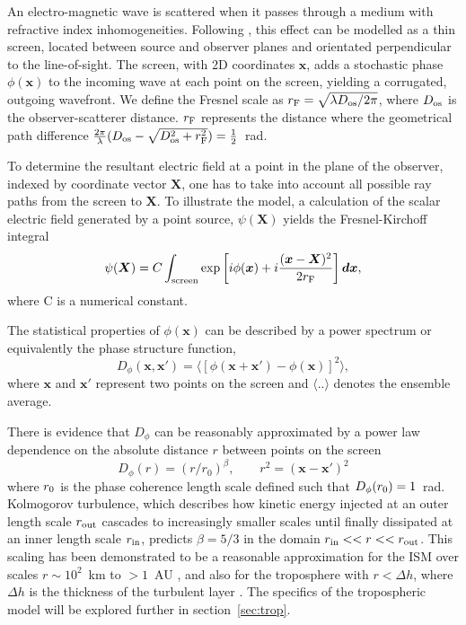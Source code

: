 An electro-magnetic wave is scattered when it passes through a medium with refractive index inhomogeneities. Following \citet{Narayan_1992}, this effect can be modelled as a thin screen, located between source and observer planes and orientated perpendicular to the line-of-sight. The screen, with 2D coordinates $\mathbf{x}$, adds a stochastic phase $\phi(\mathbf{x})$ to the incoming wave at each point on the screen, yielding a corrugated, outgoing wavefront. We define the Fresnel scale as  $r_{\rm F} = \sqrt{\lambda D_{\rm os}/2\pi}$, where $D_{\rm os}$ is the observer-scatterer distance.  $r_{\rm F}$ represents the distance where the geometrical path difference $\frac{2\pi}{\lambda} (D_{\rm os} - \sqrt{D_{\rm os}^2 + r_{\rm F}^2}) =\frac{1}{2}$~rad.

To determine the resultant electric field at a point in the plane of the observer, indexed by coordinate vector $\bm{X}$, one has to take into account all possible ray paths from the screen to $\bm{X}$. To illustrate the model, a calculation of the scalar electric field generated by a point source, $\psi(\bm{X})$ yields the Fresnel-Kirchoff integral \citep*{BORN_1980}
\begin{equation}\label{Fresnel- Kirchoff}
\psi(\boldsymbol{X}) = C \int_{\rm screen} \exp\left[i\phi(\boldsymbol{x}) + i \frac{(\boldsymbol{x}-\boldsymbol{X})^2}{2 r_{\rm F}}\right]\boldsymbol{dx},
\end{equation}
where C is a numerical constant.

The statistical properties of $\phi(\mathbf{x})$ can be described by a power spectrum or equivalently the phase structure function,
\begin{equation}\label{eq:D_phi}
D_\phi (\mathbf{x},\mathbf{x'}) = \langle \left[ \phi(\mathbf{x} +\mathbf{x'}) - \phi(\mathbf{x})\right]^2 \rangle,
\end{equation}
where $\mathbf{x}$ and $\mathbf{x'} $ represent two points on the screen and $\langle .. \rangle$ denotes the ensemble average. 

There is evidence that $D_\phi$ can be reasonably approximated by a power law dependence on the absolute distance $r$ between points on the screen  \citep{Armstrong_1995,carilli_1997}
\begin{equation}
D_\phi (r) =  (r/r_0)^\beta,\qquad r^2 = (\mathbf{x} - \mathbf{x'})^2
\label{kolmogorov}
\end{equation}
where $r_{\rm 0}$ is the phase coherence length scale defined such that $D_\phi(r_{\rm 0}) = 1$~rad. 
Kolmogorov turbulence, which describes how kinetic energy injected at an outer length scale $r_{\rm out}$ cascades to increasingly smaller scales until finally dissipated at an inner length scale $r_{\rm in}$, predicts $\beta = 5/3$ in the domain ${r_{\rm in}<<r<<r_{\rm out}}$. This scaling has been demonstrated to be a reasonable approximation for the ISM over scales $r \sim 10^2$~km to $>1$~AU \citep*{Johnson_2015a}, and also for the troposphere with $r< \Delta h$, where $\Delta h$ is the thickness of the turbulent layer \cite{Coulman_1985}. The specifics of the tropospheric model will be explored further in section~\ref{sec:trop}.

